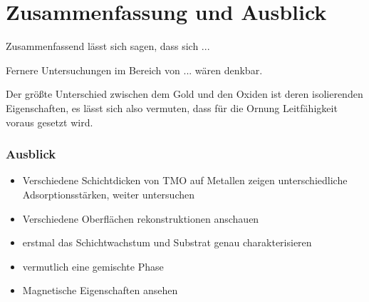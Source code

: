 \chapter{Zusammenfassung und Ausblick}
    Zusammenfassend lässt sich sagen, dass sich  ...

    Fernere Untersuchungen im Bereich von ... wären denkbar.

    Der größte Unterschied zwischen dem Gold und den Oxiden ist deren isolierenden Eigenschaften, es lässt sich also vermuten, dass für die Ornung Leitfähigkeit voraus gesetzt wird.


    \subsection{Ausblick}
    \begin{itemize}
        \item Verschiedene Schichtdicken von TMO auf Metallen zeigen unterschiedliche Adsorptionsstärken, weiter untersuchen \cite{IF_8}
        \item Verschiedene Oberflächen rekonstruktionen anschauen
        \item erstmal das Schichtwachstum und Substrat genau charakterisieren
        \item {} vermutlich eine gemischte Phase
        \item Magnetische Eigenschaften ansehen
    \end{itemize}